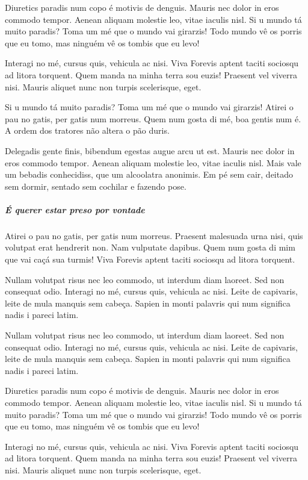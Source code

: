 Diuretics paradis num copo é motivis de denguis. Mauris nec dolor in eros
commodo tempor. Aenean aliquam molestie leo, vitae iaculis nisl. Si u mundo tá
muito paradis? Toma um mé que o mundo vai girarzis! Todo mundo vê os porris que
eu tomo, mas ninguém vê os tombis que eu levo!

Interagi no mé, cursus quis, vehicula ac nisi. Viva Forevis aptent taciti
sociosqu ad litora torquent. Quem manda na minha terra sou euzis! Praesent vel
viverra nisi. Mauris aliquet nunc non turpis scelerisque, eget.

Si u mundo tá muito paradis? Toma um mé que o mundo vai girarzis! Atirei o pau
no gatis, per gatis num morreus. Quem num gosta di mé, boa gentis num é. A
ordem dos tratores não altera o pão duris.

Delegadis gente finis, bibendum egestas augue arcu ut est. Mauris nec dolor in
eros commodo tempor. Aenean aliquam molestie leo, vitae iaculis nisl. Mais vale
um bebadis conhecidiss, que um alcoolatra anonimis. Em pé sem cair, deitado sem
dormir, sentado sem cochilar e fazendo pose.

\subparagraph{É querer estar preso por vontade}

Atirei o pau no gatis, per gatis num morreus. Praesent malesuada urna nisi,
quis volutpat erat hendrerit non. Nam vulputate dapibus. Quem num gosta di mim
que vai caçá sua turmis! Viva Forevis aptent taciti sociosqu ad litora
torquent.

Nullam volutpat risus nec leo commodo, ut interdum diam laoreet. Sed non
consequat odio. Interagi no mé, cursus quis, vehicula ac nisi. Leite de
capivaris, leite de mula manquis sem cabeça. Sapien in monti palavris qui num
significa nadis i pareci latim.


Nullam volutpat risus nec leo commodo, ut interdum diam laoreet. Sed non
consequat odio. Interagi no mé, cursus quis, vehicula ac nisi. Leite de
capivaris, leite de mula manquis sem cabeça. Sapien in monti palavris qui num
significa nadis i pareci latim.

Diuretics paradis num copo é motivis de denguis. Mauris nec dolor in eros
commodo tempor. Aenean aliquam molestie leo, vitae iaculis nisl. Si u mundo tá
muito paradis? Toma um mé que o mundo vai girarzis! Todo mundo vê os porris que
eu tomo, mas ninguém vê os tombis que eu levo!

Interagi no mé, cursus quis, vehicula ac nisi. Viva Forevis aptent taciti
sociosqu ad litora torquent. Quem manda na minha terra sou euzis! Praesent vel
viverra nisi. Mauris aliquet nunc non turpis scelerisque, eget.

